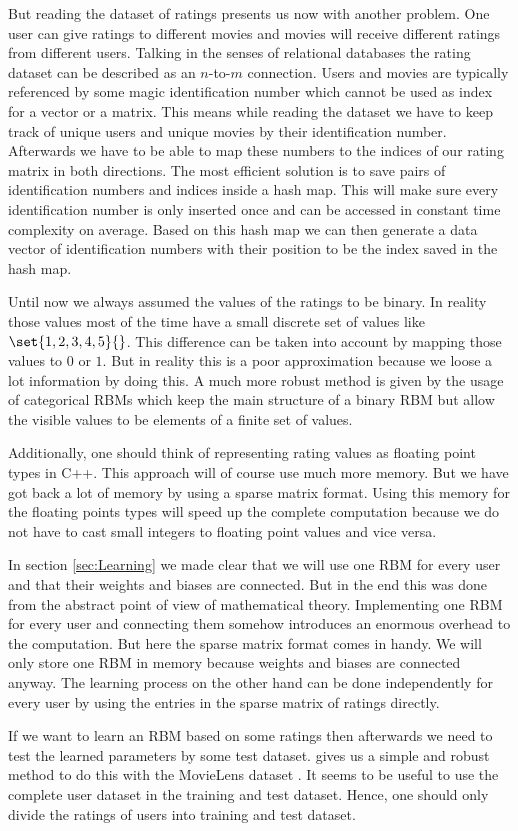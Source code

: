 \documentclass[crop=false,10pt]{standalone}
\begin{document}
    But reading the dataset of ratings presents us now with another problem.
    One user can give ratings to different movies and movies will receive different ratings from different users.
    Talking in the senses of relational databases the rating dataset can be described as an $n$-to-$m$ connection.
    Users and movies are typically referenced by some magic identification number which cannot be used as index for a vector or a matrix.
    This means while reading the dataset we have to keep track of unique users and unique movies by their identification number.
    Afterwards we have to be able to map these numbers to the indices of our rating matrix in both directions.
    The most efficient solution is to save pairs of identification numbers and indices inside a hash map.
    This will make sure every identification number is only inserted once and can be accessed in constant time complexity on average.
    Based on this hash map we can then generate a data vector of identification numbers with their position to be the index saved in the hash map.

    Until now we always assumed the values of the ratings to be binary.
    In reality those values most of the time have a small discrete set of values like $\set{1,2,3,4,5}{}$.
    This difference can be taken into account by mapping those values to $0$ or $1$.
    But in reality this is a poor approximation because we loose a lot information by doing this.
    A much more robust method is given by the usage of categorical RBMs which keep the main structure of a binary RBM but allow the visible values to be elements of a finite set of values.
    \cite{Hinton2007,Hinton2010,Murphy2012,towardsdatascience}

    Additionally, one should think of representing rating values as floating point types in C++.
    This approach will of course use much more memory.
    But we have got back a lot of memory by using a sparse matrix format.
    Using this memory for the floating points types will speed up the complete computation because we do not have to cast small integers to floating point values and vice versa.

    In section \ref{sec:Learning} we made clear that we will use one RBM for every user and that their weights and biases are connected.
    But in the end this was done from the abstract point of view of mathematical theory.
    Implementing one RBM for every user and connecting them somehow introduces an enormous overhead to the computation.
    But here the sparse matrix format comes in handy.
    We will only store one RBM in memory because weights and biases are connected anyway.
    The learning process on the other hand can be done independently for every user by using the entries in the sparse matrix of ratings directly.

    If we want to learn an RBM based on some ratings then afterwards we need to test the learned parameters by some test dataset.
    \cite{towardsdatascience} gives us a simple and robust method to do this with the MovieLens dataset \cite{MovieLensDataset}.
    It seems to be useful to use the complete user dataset in the training and test dataset.
    Hence, one should only divide the ratings of users into training and test dataset.
    \cite{towardsdatascience}
\end{document}
